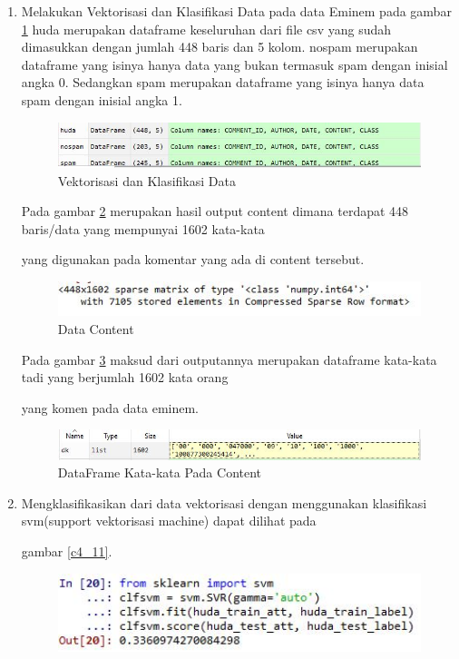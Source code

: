 \begin{enumerate}
\item Melakukan Vektorisasi dan Klasifikasi Data pada data Eminem pada gambar \ref{c4_8} huda merupakan dataframe keseluruhan dari file csv yang sudah dimasukkan dengan jumlah 448 baris dan 5 kolom. nospam merupakan dataframe yang isinya hanya data yang bukan termasuk spam dengan inisial angka 0. Sedangkan spam merupakan dataframe yang isinya hanya data spam dengan inisial angka 1.
\begin{figure}[ht]
	\centerline{\includegraphics[width=1\textwidth]{figures/huda/chapter4/8.JPG}}
	\caption{Vektorisasi dan Klasifikasi Data}
	\label{c4_8}
\end{figure}
\subitem  Pada gambar \ref{c4_9} merupakan hasil output content dimana terdapat 448 baris/data yang mempunyai 1602 kata-kata \par yang digunakan pada komentar yang ada di content tersebut.
\begin{figure}[ht]
	\centerline{\includegraphics[width=1\textwidth]{figures/huda/chapter4/9.JPG}}
	\caption{Data Content}
	\label{c4_9}
\end{figure}
\subitem Pada gambar \ref{c4_10} maksud dari outputannya merupakan dataframe kata-kata tadi yang berjumlah 1602 kata orang \par yang komen pada data eminem.
\begin{figure}[ht]
	\centerline{\includegraphics[width=1\textwidth]{figures/huda/chapter4/10.JPG}}
	\caption{DataFrame Kata-kata Pada Content}
	\label{c4_10}
\end{figure}
\item Mengklasifikasikan dari data vektorisasi dengan menggunakan klasifikasi svm(support vektorisasi machine) dapat dilihat pada \par gambar \ref{c4_11}.
\begin{figure}[ht]
	\centerline{\includegraphics[width=1\textwidth]{figures/huda/chapter4/11.JPG}}

\end{figure}
\end{enumerate}
